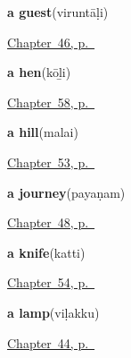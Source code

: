 \noindent\begin{minipage}[t]{\linewidth}
\raggedright
\textbf{a guest}\enspace\emph{}\enspace(viruntāḷi)\par
\footnotesize \hyperref[ch:ta-roles]{Chapter~46, p.~\pageref*{ch:ta-roles}}
\end{minipage}\par\smallskip

\noindent\begin{minipage}[t]{\linewidth}
\raggedright
\textbf{a hen}\enspace\emph{}\enspace(kōḻi)\par
\footnotesize \hyperref[ch:ta-around-the-yard]{Chapter~58, p.~\pageref*{ch:ta-around-the-yard}}
\end{minipage}\par\smallskip

\noindent\begin{minipage}[t]{\linewidth}
\raggedright
\textbf{a hill}\enspace\emph{}\enspace(malai)\par
\footnotesize \hyperref[ch:ta-the-land]{Chapter~53, p.~\pageref*{ch:ta-the-land}}
\end{minipage}\par\smallskip

\noindent\begin{minipage}[t]{\linewidth}
\raggedright
\textbf{a journey}\enspace\emph{}\enspace(payaṇam)\par
\footnotesize \hyperref[ch:ta-setting-out]{Chapter~48, p.~\pageref*{ch:ta-setting-out}}
\end{minipage}\par\smallskip

\noindent\begin{minipage}[t]{\linewidth}
\raggedright
\textbf{a knife}\enspace\emph{}\enspace(katti)\par
\footnotesize \hyperref[ch:ta-things-in-the-house]{Chapter~54, p.~\pageref*{ch:ta-things-in-the-house}}
\end{minipage}\par\smallskip

\noindent\begin{minipage}[t]{\linewidth}
\raggedright
\textbf{a lamp}\enspace\emph{}\enspace(viḷakku)\par
\footnotesize \hyperref[ch:ta-things-you-ask-for]{Chapter~44, p.~\pageref*{ch:ta-things-you-ask-for}}
\end{minipage}\par\smallskip

